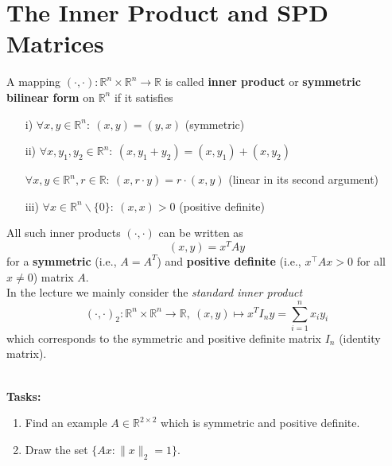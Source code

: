 \section{The Inner Product and SPD Matrices}
{\color{navy} A mapping $(\cdot,\cdot)\colon \mathbb{R}^n\times \mathbb{R}^n \to \mathbb{R}$ is called \textbf{inner product} or \textbf{symmetric bilinear form} on $\mathbb{R}^n$ if it satisfies
\begin{itemize}
	\item[i)] $\forall x,y \in \mathbb{R}^n: ~(x,y) = (y,x)$ \hspace{3.6cm} (symmetric)
	\item[ii)] $\forall x,y_1,y_2 \in \mathbb{R}^n: ~(x,y_1+y_2) = (x,y_1)+(x,y_2)$
	\item[] $\forall x,y \in \mathbb{R}^n, r \in \mathbb{R}: ~ (x,r\cdot y)=r\cdot(x,y)$ \hspace{1.8cm} (linear in its second argument)
	\item[iii)]$\forall x \in \mathbb{R}^n\backslash\{0\}: ~ (x,x) > 0$\hspace{3.9cm}  (positive definite)
\end{itemize}
All such inner products $(\cdot,\cdot)$  can be written as 
$$(x,y) = x^T A y $$
for a \textbf{symmetric} (i.e., $A = A^T$) and \textbf{positive definite} (i.e., $x^\top Ax>0$ for all $x\neq 0$) matrix $A$.
~\\
In the lecture we mainly consider the \textit{standard inner product} $$(\cdot,\cdot)_2\colon \mathbb{R}^n\times \mathbb{R}^n \to \mathbb{R},~ (x,y) \mapsto x^TI_ny=\sum_{i=1}^n x_i y_i$$ which corresponds to the symmetric and positive definite matrix $I_n$ (identity matrix).
}

%





~\\
\textbf{Tasks:}
\begin{enumerate}
	\item Find an example $A \in \mathbb{R}^{2 \times 2}$ which is symmetric and positive definite.
	\item Draw the set $\{ Ax\colon \|x\|_2 = 1\}$.
\end{enumerate}



